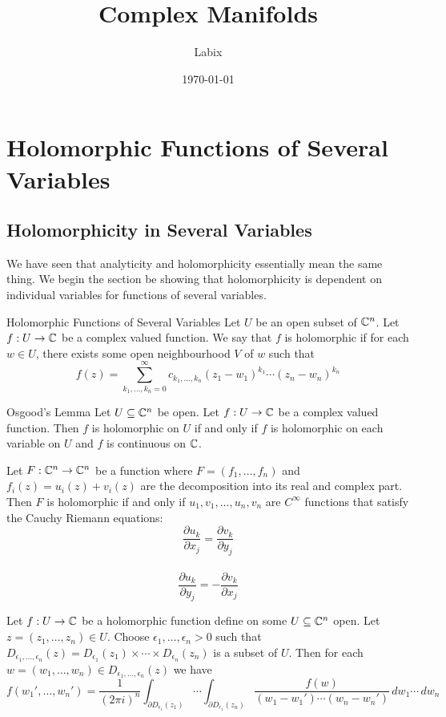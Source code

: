 \documentclass[a4paper]{article}
\title{Complex Manifolds}
\author{Labix}
\date{\today}
\begin{document}
\maketitle
\begin{abstract}
\end{abstract}
\pagebreak
\tableofcontents
\pagebreak

\section{Holomorphic Functions of Several Variables}
\subsection{Holomorphicity in Several Variables}
We have seen that analyticity and holomorphicity essentially mean the same thing. We begin the section be showing that holomorphicity is dependent on individual variables for functions of several variables. 
\begin{defn}{Holomorphic Functions of Several Variables}{} Let $U$ be an open subset of $\mathbb{C}^n$. Let $f:U\to\mathbb{C}$ be a complex valued function. We say that $f$ is holomorphic if for each $w\in U$, there exists some open neighbourhood $V$ of $w$ such that $$f(z)=\sum_{k_1,\dots,k_n=0}^\infty c_{k_1,\dots,k_n}(z_1-w_1)^{k_1}\cdots(z_n-w_n)^{k_n}$$
\end{defn}

\begin{thm}{Osgood's Lemma}{} Let $U\subseteq\mathbb{C}^n$ be open. Let $f:U\to\mathbb{C}$ be a complex valued function. Then $f$ is holomorphic on $U$ if and only if $f$ is holomorphic on each variable on $U$ and $f$ is continuous on $\mathbb{C}$. 
\end{thm}

\begin{prp}{}{} Let $F:\mathbb{C}^n\to\mathbb{C}^n$ be a function where $F=(f_1,\dots,f_n)$ and $f_i(z)=u_i(z)+v_i(z)$ are the decomposition into its real and complex part. Then $F$ is holomorphic if and only if $u_1,v_1,\dots,u_n,v_n$ are $C^\infty$ functions that satisfy the Cauchy Riemann equations: $$\frac{\partial u_k}{\partial x_j}=\frac{\partial v_k}{\partial y_j}$$~$$\frac{\partial u_k}{\partial y_j}=-\frac{\partial v_k}{\partial x_j}$$
\end{prp}

\begin{prp}{}{} Let $f:U\to\mathbb{C}$ be a holomorphic function define on some $U\subseteq\mathbb{C}^n$ open. Let $z=(z_1,\dots,z_n)\in U$. Choose $\epsilon_1,\dots,\epsilon_n>0$ such that $D_{\epsilon_1,\dots,\epsilon_n}(z)=D_{\epsilon_1}(z_1)\times\cdots\times D_{\epsilon_n}(z_n)$ is a subset of $U$. Then for each $w=(w_1,\dots,w_n)\in D_{\epsilon_1,\dots,\epsilon_n}(z)$ we have $$f(w_1',\dots,w_n')=\frac{1}{(2\pi i)^n}\int_{\partial D_{\epsilon_1}(z_1)}\cdots\int_{\partial D_{\epsilon_1}(z_n)}\frac{f(w)}{(w_1-w_1')\cdots(w_n-w_n')}\,dw_1\cdots\,dw_n$$
\end{prp}
\end{document}
